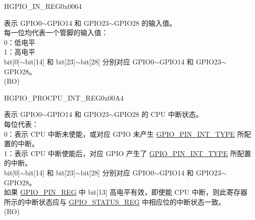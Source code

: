 \begin{register}{H}{GPIO\_IN\_REG}{0x0064}\label{regdesc:GPIOINREG}
%
\regnewline%
\begin{regdesc}\begin{reglist}
\label{fielddesc:GPIOINDATANEXT}\item [GPIO\_IN\_DATA\_NEXT] 表示 GPIO0$\sim$GPIO14 和 GPIO23$\sim$GPIO28 的输入值。\\
每一位均代表一个管脚的输入值：\\
0：低电平\\
1：高电平\\ 
bit[0]$\sim$bit[14] 和 bit[23]$\sim$bit[28] 分别对应 GPIO0$\sim$GPIO14 和 GPIO23$\sim$GPIO28。\\
(RO)
\end{reglist}\end{regdesc}
\end{register}

\begin{register}{H}{GPIO\_PROCPU\_INT\_REG}{0x00A4}\label{regdesc:GPIOPROCPUINTREG}
%
\regnewline%
\begin{regdesc}\begin{reglist}
\label{fielddesc:GPIOPROCPUINT}\item [GPIO\_PROCPU\_INT] 表示 GPIO0$\sim$GPIO14 和 GPIO23$\sim$GPIO28 的 CPU 中断状态。\\ 
每位代表：\\
0：表示 CPU 中断未使能，或对应 GPIO 未产生 \hyperref[fielddesc:GPIOPINNINTTYPE]{GPIO\_PIN\_INT\_TYPE} 所配置的中断。\\
1：表示 CPU 中断使能后，对应 GPIO 产生了 \hyperref[fielddesc:GPIOPINNINTTYPE]{GPIO\_PIN\_INT\_TYPE} 所配置的中断。\\
bit[0]$\sim$bit[14] 和 bit[23]$\sim$bit[28] 分别对应 GPIO0$\sim$GPIO14 和 GPIO23$\sim$GPIO28。\\
如果 \hyperref[regdesc:GPIOPINNREG]{GPIO\_PIN\_REG} 中 bit[13] 高电平有效，即使能 CPU 中断，则此寄存器所示的中断状态应与 \hyperref[regdesc:GPIOSTATUSREG]{GPIO\_STATUS\_REG} 中相应位的中断状态一致。 \\ (RO)
\end{reglist}\end{regdesc}
\end{register}


